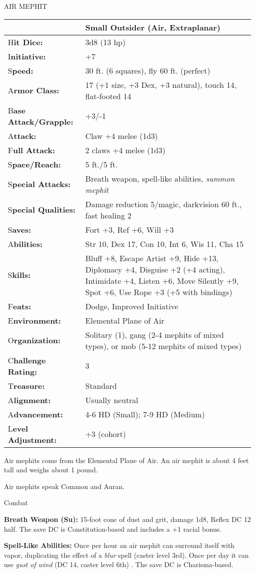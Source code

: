 \documentclass{article}
\begin{document}
\vspace{12pt}
AIR MEPHIT

\begin{tabular}{|>{\raggedright}p{87pt}|>{\raggedright}p{238pt}|}
\hline
  & Small Outsider (Air, Extraplanar)\tabularnewline
\hline
H\textbf{it Dice:} & 3d8 (13 hp)\tabularnewline
\hline
I\textbf{nitiative:} & +7\tabularnewline
\hline
S\textbf{peed:} & 30 ft. (6 squares), fly 60 ft. (perfect)\tabularnewline
\hline
A\textbf{rmor Class:} & 17 (+1 size, +3 Dex, +3 natural), touch 14, flat-footed 
14\tabularnewline
\hline
B\textbf{ase Attack/Grapple:} & +3/-1\tabularnewline
\hline
A\textbf{ttack:} & Claw +4 melee (1d3)\tabularnewline
\hline
F\textbf{ull Attack:} & 2 claws +4 melee (1d3)\tabularnewline
\hline
S\textbf{pace/Reach:} & 5 ft./5 ft.\tabularnewline
\hline
S\textbf{pecial Attacks:} & Breath weapon, spell-like abilities, \textit{summon 
mephit}\tabularnewline
\hline
S\textbf{pecial Qualities:} & Damage reduction 5/magic, darkvision 60 ft., fast 
healing 2\tabularnewline
\hline
S\textbf{aves:} & Fort +3, Ref +6, Will +3\tabularnewline
\hline
A\textbf{bilities:} & Str 10, Dex 17, Con 10, Int 6, Wis 11, Cha 15\tabularnewline
\hline
S\textbf{kills:} & Bluff +8, Escape Artist +9, Hide +13, Diplomacy +4, Disguise 
+2 (+4 acting), Intimidate +4, Listen +6, Move Silently +9, Spot +6, Use Rope +3 
(+5 with bindings)\tabularnewline
\hline
F\textbf{eats:} & Dodge, Improved Initiative\tabularnewline
\hline
E\textbf{nvironment:} & Elemental Plane of Air\tabularnewline
\hline
O\textbf{rganization:} & Solitary (1), gang (2-4 mephits of mixed types), or mob 
(5-12 mephits of mixed types)\tabularnewline
\hline
C\textbf{hallenge Rating:} & 3\tabularnewline
\hline
T\textbf{reasure:} & Standard\tabularnewline
\hline
A\textbf{lignment:} & Usually neutral\tabularnewline
\hline
A\textbf{dvancement:} & 4-6 HD (Small); 7-9 HD (Medium)\tabularnewline
\hline
L\textbf{evel Adjustment:} & +3 (cohort)\tabularnewline
\hline
\end{tabular}

Air mephits come from the Elemental Plane of Air. An air mephit is about 4 feet 
tall and weighs about 1 pound. 

Air mephits speak Common and Auran.

Combat

\textbf{Breath Weapon (Su):} 15-foot cone of dust and grit, damage 1d8, Reflex 
DC 12 half. The save DC is Constitution-based and includes a +1 racial bonus.

\textbf{Spell-Like Abilities:} Once per hour an air mephit can surround itself 
with vapor, duplicating the effect of a \textit{blur }spell (caster level 3rd). 
Once per day it can use \textit{gust of wind }(DC 14, caster level 6th) . The save 
DC is Charisma-based.
\end{document}
